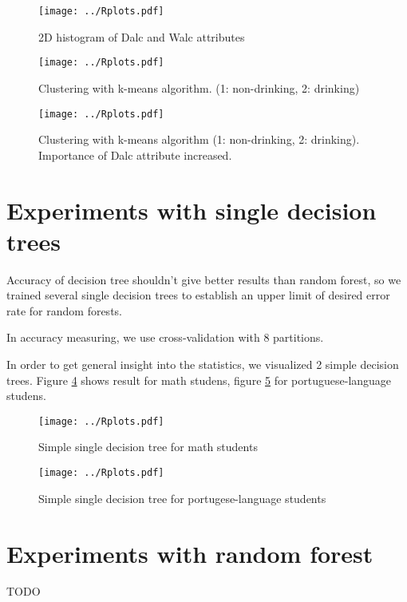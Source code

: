 \documentclass[a4paper]{article}
\begin{document}

\begin{figure}[h]
    \caption[]{2D histogram of Dalc and Walc attributes}
    \centering
    \texttt{[image: ../Rplots.pdf]}
    \label{fig:hist2D}
\end{figure}

\begin{figure}[h]
    \caption[]{Clustering with k-means algorithm. (1: non-drinking, 2: drinking)}
    \centering
    \texttt{[image: ../Rplots.pdf]}
    \label{fig:clust}
\end{figure}

\begin{figure}[h]
    \caption[]{Clustering with k-means algorithm (1: non-drinking, 2: drinking). Importance of Dalc attribute increased.}
    \centering
    \texttt{[image: ../Rplots.pdf]}
    \label{fig:clust2}
\end{figure}

\section{Experiments with single decision trees}

Accuracy of decision tree shouldn't give better results than random forest,
so we trained several single decision trees to establish
an upper limit of desired error rate for random forests.

In accuracy measuring, we use cross-validation with 8 partitions.

In order to get general insight into the statistics, we visualized 2 simple decision trees.
Figure \ref{fig:single1} shows result for math studens,
figure \ref{fig:single2} for portuguese-language studens.

\begin{figure}[h]
    \caption[]{Simple single decision tree for math students}
    \centering
    \texttt{[image: ../Rplots.pdf]}
    \label{fig:single1}
\end{figure}

\begin{figure}[h]
    \caption[]{Simple single decision tree for portugese-language students}
    \centering
    \texttt{[image: ../Rplots.pdf]}
    \label{fig:single2}
\end{figure}

\section{Experiments with random forest}
TODO
\end{document}
